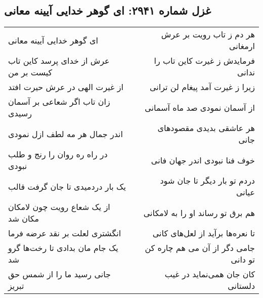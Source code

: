 \begin{center}
\section*{غزل شماره ۲۹۴۱: ای گوهر خدایی آیینه معانی}
\label{sec:2941}
\begin{longtable}{l p{0.5cm} r}
ای گوهر خدایی آیینه معانی
&&
هر دم ز تاب رویت بر عرش ارمغانی
\\
عرش از خدای پرسد کاین تاب کیست بر من
&&
فرمایدش ز غیرت کاین تاب را ندانی
\\
از غیرت الهی در عرش حیرت افتد
&&
زیرا ز غیرت آمد پیغام لن ترانی
\\
زان تاب اگر شعاعی بر آسمان رسیدی
&&
از آسمان نمودی صد ماه آسمانی
\\
اندر جمال هر مه لطف ازل نمودی
&&
هر عاشقی بدیدی مقصودهای جانی
\\
در راه ره روان را رنج و طلب نبودی
&&
خوف فنا نبودی اندر جهان فانی
\\
یک بار دردمیدی تا جان گرفت قالب
&&
دردم تو بار دیگر تا جان شود عیانی
\\
از یک شعاع رویت چون لامکان مکان شد
&&
هم برق تو رساند او را به لامکانی
\\
انگشتری لعلت بر نقد عرضه فرما
&&
تا نعره‌ها برآید از لعل‌های کانی
\\
یک جام مان بدادی تا رخت‌ها گرو شد
&&
جامی دگر از آن می هم چاره کن تو دانی
\\
جانی رسید ما را از شمس حق تبریز
&&
کان جان همی‌نماید در غیب دلستانی
\\
\end{longtable}
\end{center}
